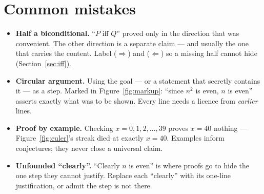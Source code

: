 \section{Common mistakes}\label{sec:mistakes2}
\begin{itemize}
\item \textbf{Half a biconditional.} ``$P$ iff $Q$'' proved only in the direction
that was convenient. The other direction is a separate claim --- and usually the
one that carries the content. Label ($\Rightarrow$) and ($\Leftarrow$) so a
missing half cannot hide (Section~\ref{sec:iff}).
\item \textbf{Circular argument.} Using the goal --- or a statement that secretly
contains it --- as a step. Marked  in
Figure~\ref{fig:markup}: ``since $n^2$ is even, $n$ is even'' asserts exactly
what was to be shown. Every line needs a licence from \emph{earlier} lines.
\item \textbf{Proof by example.} Checking $x = 0,1,2,\dots,39$ proves $x = 40$
nothing --- Figure~\ref{fig:euler}'s streak died at exactly $x = 40$. Examples
inform conjectures; they never close a universal claim.
\item \textbf{Unfounded ``clearly''.} ``Clearly $n$ is even'' is where proofs go
to hide the one step they cannot justify. Replace each ``clearly'' with its
one-line justification, or admit the step is not there.
\end{itemize}


